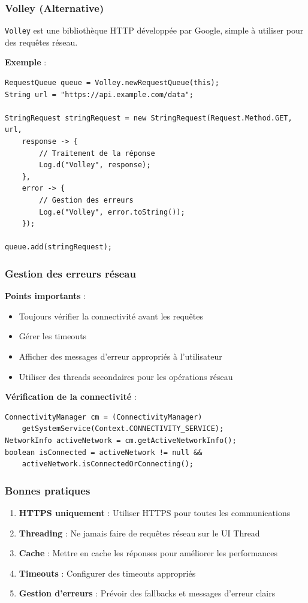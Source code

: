 \documentclass[11pt,a4paper]{article}
\begin{document}
\subsubsection{Volley (Alternative)}

\texttt{Volley} est une bibliothèque HTTP développée par Google, simple à utiliser pour des requêtes réseau.

\textbf{Exemple} :
\begin{lstlisting}
RequestQueue queue = Volley.newRequestQueue(this);
String url = "https://api.example.com/data";

StringRequest stringRequest = new StringRequest(Request.Method.GET, url,
    response -> {
        // Traitement de la réponse
        Log.d("Volley", response);
    },
    error -> {
        // Gestion des erreurs
        Log.e("Volley", error.toString());
    });

queue.add(stringRequest);
\end{lstlisting}

\subsubsection{Gestion des erreurs réseau}

\textbf{Points importants} :
\begin{itemize}
    \item Toujours vérifier la connectivité avant les requêtes
    \item Gérer les timeouts
    \item Afficher des messages d'erreur appropriés à l'utilisateur
    \item Utiliser des threads secondaires pour les opérations réseau
\end{itemize}

\textbf{Vérification de la connectivité} :
\begin{lstlisting}
ConnectivityManager cm = (ConnectivityManager) 
    getSystemService(Context.CONNECTIVITY_SERVICE);
NetworkInfo activeNetwork = cm.getActiveNetworkInfo();
boolean isConnected = activeNetwork != null && 
    activeNetwork.isConnectedOrConnecting();
\end{lstlisting}

\subsubsection{Bonnes pratiques}

\begin{enumerate}
    \item \textbf{HTTPS uniquement} : Utiliser HTTPS pour toutes les communications
    \item \textbf{Threading} : Ne jamais faire de requêtes réseau sur le UI Thread
    \item \textbf{Cache} : Mettre en cache les réponses pour améliorer les performances
    \item \textbf{Timeouts} : Configurer des timeouts appropriés
    \item \textbf{Gestion d'erreurs} : Prévoir des fallbacks et messages d'erreur clairs
\end{enumerate}
\end{document}
